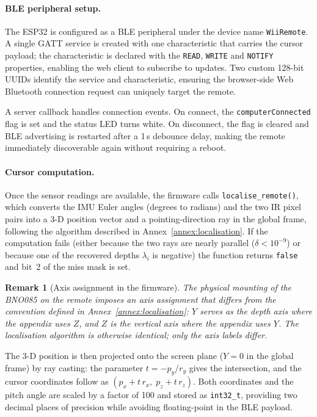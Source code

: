 \documentclass[12pt, a4paper]{article}
\newtheorem{remark}{Remark}
\begin{document}
\paragraph{BLE peripheral setup.}
The ESP32 is configured as a BLE peripheral under the device name \texttt{WiiRemote}. A single GATT service is created with one characteristic that carries the cursor payload; the characteristic is declared with the \texttt{READ}, \texttt{WRITE} and \texttt{NOTIFY} properties, enabling the web client to subscribe to updates. Two custom 128-bit UUIDs identify the service and characteristic, ensuring the browser-side Web Bluetooth connection request can uniquely target the remote.

A server callback handles connection events. On connect, the \texttt{computerConnected} flag is set and the status LED turns white. On disconnect, the flag is cleared and BLE advertising is restarted after a 1\,s debounce delay, making the remote immediately discoverable again without requiring a reboot.

\paragraph{Cursor computation.}
Once the sensor readings are available, the firmware calls \texttt{localise\_remote()}, which converts the IMU Euler angles (degrees to radians) and the two IR pixel pairs into a 3-D position vector and a pointing-direction ray in the global frame, following the algorithm described in Annex~\ref{annex:localisation}. If the computation fails (either because the two rays are nearly parallel ($\delta < 10^{-9}$) or because one of the recovered depths $\lambda_i$ is negative) the function returns \texttt{false} and bit~2 of the miss mask is set.

\begin{remark}[Axis assignment in the firmware]
The physical mounting of the BNO085 on the remote imposes an axis assignment that differs from the convention defined in Annex~\ref{annex:localisation}: $Y$ serves as the depth axis where the appendix uses $Z$, and $Z$ is the vertical axis where the appendix uses $Y$. The localisation algorithm is otherwise identical; only the axis labels differ.
\end{remark}

The 3-D position is then projected onto the screen plane ($Y = 0$ in the global frame) by ray casting: the parameter $t = -p_y / r_y$ gives the intersection, and the cursor coordinates follow as $(p_x + t\,r_x,\; p_z + t\,r_z)$. Both coordinates and the pitch angle are scaled by a factor of 100 and stored as \texttt{int32\_t}, providing two decimal places of precision while avoiding floating-point in the BLE payload.
\end{document}
